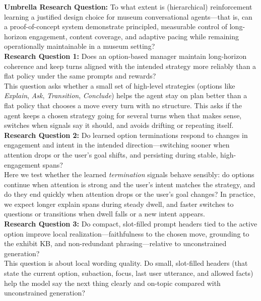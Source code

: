 \documentclass[12pt]{article}
\begin{document}
\noindent\textbf{Umbrella Research Question:} To what extent is (hierarchical) reinforcement learning a justified design choice for museum conversational agents—that is, can a proof-of-concept system demonstrate principled, measurable control of long-horizon engagement, content coverage, and adaptive pacing while remaining operationally maintainable in a museum setting?\\

\noindent\textbf{Research Question 1:} Does an option-based manager maintain long-horizon coherence and keep turns aligned with the intended strategy more reliably than a flat policy under the same prompts and rewards?\\

This question asks whether a small set of high-level strategies (options like \emph{Explain}, \emph{Ask}, \emph{Transition}, \emph{Conclude}) helps the agent stay on plan better than a flat policy that chooses a move every turn with no structure. This asks if the agent keeps a chosen strategy going for several turns when that makes sense, switches when signals say it should, and avoids drifting or repeating itself.\\

\noindent\textbf{Research Question 2:} Do learned option terminations respond to changes in engagement and intent in the intended direction—switching sooner when attention drops or the user’s goal shifts, and persisting during stable, high-engagement spans?\\

Here we test whether the learned \emph{termination} signals behave sensibly: do options continue when attention is strong and the user’s intent matches the strategy, and do they end quickly when attention drops or the user’s goal changes? In practice, we expect longer explain spans during steady dwell, and faster switches to questions or transitions when dwell falls or a new intent appears.\\

\textbf{Research Question 3:} Do compact, slot-filled prompt headers tied to the active option improve local realization—faithfulness to the chosen move, grounding to the exhibit KB, and non-redundant phrasing—relative to unconstrained generation?\\

This question is about local wording quality. Do small, slot-filled headers (that state the current option, subaction, focus, last user utterance, and allowed facts) help the model say the next thing clearly and on-topic compared with unconstrained generation? 
\end{document}
